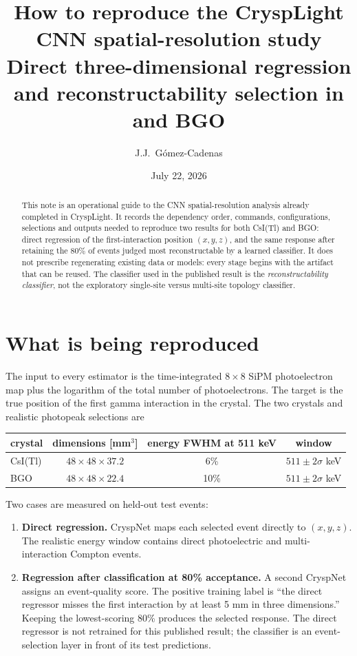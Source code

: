 \documentclass[11pt,a4paper]{article}
\title{How to reproduce the CryspLight CNN spatial-resolution study\\
\large Direct three-dimensional regression and reconstructability selection
in \csitl{} and BGO}
\author{J.J.~G\'omez-Cadenas}
\date{July 22, 2026}
\newcommand{\csitl}{CsI(Tl)}
\begin{document}
\maketitle

\begin{abstract}
This note is an operational guide to the CNN spatial-resolution analysis already
completed in CryspLight. It records the dependency order, commands,
configurations, selections and outputs needed to reproduce two results for both
\csitl{} and BGO: direct regression of the first-interaction position
$(x,y,z)$, and the same response after retaining the 80\% of events judged most
reconstructable by a learned classifier. It does not prescribe regenerating
existing data or models: every stage begins with the artifact that can be
reused. The classifier used in the published result is the
\emph{reconstructability classifier}, not the exploratory single-site versus
multi-site topology classifier.
\end{abstract}

\tableofcontents

\section{What is being reproduced}

The input to every estimator is the time-integrated $8\times8$ SiPM
photoelectron map plus the logarithm of the total number of photoelectrons. The
target is the true position of the first gamma interaction in the crystal. The
two crystals and realistic photopeak selections are

\begin{center}
\begin{tabular}{lccc}
\toprule
crystal & dimensions [mm$^3$] & energy FWHM at 511 keV & window \\
\midrule
\csitl{} & $48\times48\times37.2$ & 6\%  & $511\pm2\sigma$ keV \\
BGO      & $48\times48\times22.4$ & 10\% & $511\pm2\sigma$ keV \\
\bottomrule
\end{tabular}
\end{center}

Two cases are measured on held-out test events:

\begin{enumerate}
  \item \textbf{Direct regression.} CryspNet maps each selected event directly
  to $(x,y,z)$. The realistic energy window contains direct photoelectric and
  multi-interaction Compton events.
  \item \textbf{Regression after classification at 80\% acceptance.} A second
  CryspNet assigns an event-quality score. The positive training label is
  ``the direct regressor misses the first interaction by at least 5 mm in
  three dimensions.'' Keeping the lowest-scoring 80\% produces the selected
  response. The direct regressor is not retrained for this published result;
  the classifier is an event-selection layer in front of its test predictions.
\end{enumerate}
\end{document}
